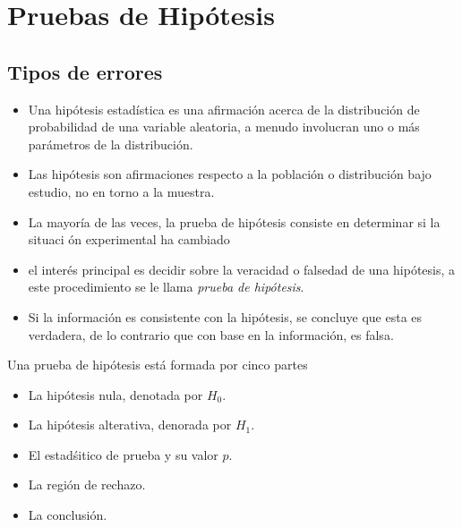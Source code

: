 \section{Pruebas de Hip\'otesis}
\subsection{Tipos de errores}




\begin{itemize}
\item Una hip\'otesis estad\'istica es una afirmaci\'on  acerca de la distribuci\'on de probabilidad de una variable aleatoria, a menudo involucran uno o m\'as par\'ametros de la distribuci\'on.

\item Las hip\'otesis son afirmaciones respecto a la poblaci\'on o distribuci\'on bajo estudio, no en torno a la muestra.

\item La mayor\'ia de las veces, la prueba de hip\'otesis consiste en determinar si la situaci \'on experimental ha cambiado

\item el inter\'es principal es decidir sobre la veracidad o falsedad de una hip\'otesis, a este procedimiento se le llama \textit{prueba de hip\'otesis}.

\item Si la informaci\'on es consistente con la hip\'otesis, se concluye que esta es verdadera, de lo contrario que con base en la informaci\'on, es falsa.

\end{itemize}







Una prueba de hip\'otesis est\'a formada por cinco partes
\begin{itemize}
\item La hip\'otesis nula, denotada por $H_{0}$.
\item La hip\'otesis alterativa, denorada por $H_{1}$.
\item El estad\'sitico de prueba y su valor $p$.
\item La regi\'on de rechazo.
\item La conclusi\'on.

\end{itemize}

